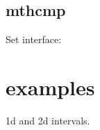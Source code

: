 \subsection{mthcmp}

Set interface:


%   
%   
% 
% 
% 
% 
% 
% 
 
\section{examples}
 
1d and 2d intervals.
 
